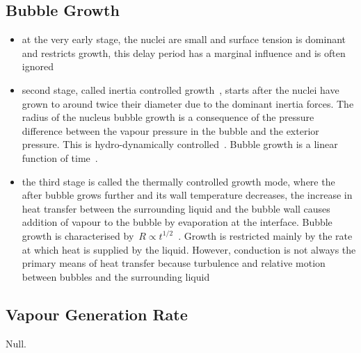 \subsection{Bubble Growth}
\begin{itemize}
	\item at the very early stage, the nuclei are small and surface tension is dominant and restricts growth, this delay period has a marginal influence and is often ignored~\cite{miyatakeSimpleUniversalEquation1997, liaoFlashingEvaporationDifferent2013}
	\item second stage, called inertia controlled growth~\cite{Gartner2024-zh}, starts after the nuclei have grown to around twice their diameter due to the dominant inertia forces. The radius of the nucleus bubble growth is a consequence of the pressure difference between the vapour pressure in the bubble and the exterior pressure. This is hydro-dynamically controlled~\cite{liaoFlashingEvaporationDifferent2013}. Bubble growth is a linear function of time~\cite{miyatakeSimpleUniversalEquation1997}.
	\item the third stage is called the thermally controlled growth mode, where the after bubble grows further and its wall temperature decreases, the increase in heat transfer between the surrounding liquid and the bubble wall causes addition of vapour to the bubble by evaporation at the interface. Bubble growth is characterised by~$R \propto t^{1/2}$~\cite{miyatakeSimpleUniversalEquation1997}. Growth is restricted mainly by the rate at which heat is supplied by the liquid. However, conduction is not always the primary means of heat transfer because turbulence and relative motion between bubbles and the surrounding liquid~\cite{liaoComputationalModellingFlash2017}
\end{itemize}
\subsection{Vapour Generation Rate}
Null.

